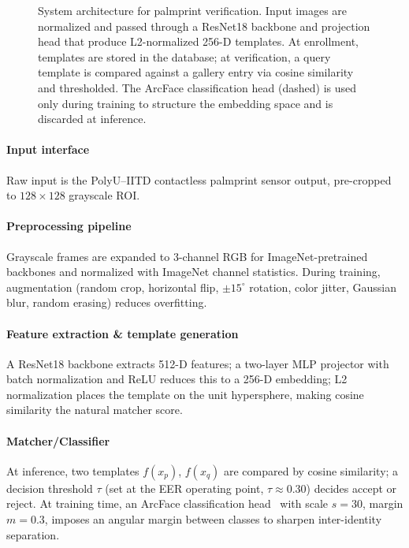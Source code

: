 \documentclass[conference]{IEEEtran}
\begin{document}
\begin{figure}[t]
\caption{System architecture for palmprint verification. Input images are normalized and passed through a ResNet18 backbone and projection head that produce L2-normalized 256-D templates. At enrollment, templates are stored in the database; at verification, a query template is compared against a gallery entry via cosine similarity and thresholded. The ArcFace classification head (dashed) is used only during training to structure the embedding space and is discarded at inference.}
\label{fig:arch}
\end{figure}

\paragraph{Input interface}
Raw input is the PolyU--IITD contactless palmprint sensor output, pre-cropped to $128\!\times\!128$ grayscale ROI.

\paragraph{Preprocessing pipeline}
Grayscale frames are expanded to 3-channel RGB for ImageNet-pretrained backbones and normalized with ImageNet channel statistics. During training, augmentation (random crop, horizontal flip, $\pm 15^\circ$ rotation, color jitter, Gaussian blur, random erasing) reduces overfitting.

\paragraph{Feature extraction \& template generation}
A ResNet18 backbone extracts 512-D features; a two-layer MLP projector with batch normalization and ReLU reduces this to a 256-D embedding; L2 normalization places the template on the unit hypersphere, making cosine similarity the natural matcher score.

\paragraph{Matcher/Classifier}
At inference, two templates $f(x_p)$, $f(x_q)$ are compared by cosine similarity; a decision threshold $\tau$ (set at the EER operating point, $\tau \approx 0.30$) decides accept or reject. At training time, an ArcFace classification head~\cite{deng2019arcface} with scale $s\!=\!30$, margin $m\!=\!0.3$, imposes an angular margin between classes to sharpen inter-identity separation.
\end{document}
